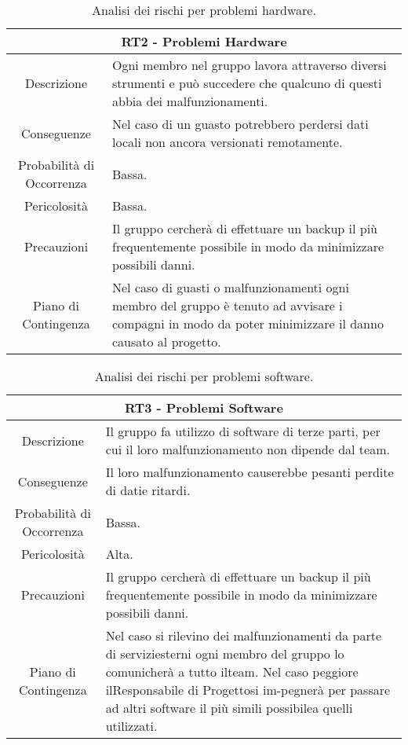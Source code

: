 \begin{table} [H]
    \begin{tabular}{|c | p{10cm}|}
    \hline
    \multicolumn{2}{|c|}{\textbf{RT2 - Problemi Hardware}} \\
    \hline
     Descrizione & Ogni membro nel gruppo lavora attraverso diversi strumenti e può succedere che qualcuno di questi abbia dei malfunzionamenti.\\ 
     \hline
     Conseguenze & Nel caso di un guasto potrebbero perdersi dati locali non ancora versionati remotamente.\\
     \hline
     Probabilità di Occorrenza & Bassa.\\
     \hline
     Pericolosità & Bassa.\\
     \hline
     Precauzioni & Il gruppo cercherà di effettuare un backup il più frequentemente possibile in modo da minimizzare possibili danni.\\  
     \hline
     Piano di Contingenza & Nel caso di guasti o malfunzionamenti ogni membro del gruppo è tenuto ad avvisare i compagni in modo da poter minimizzare il danno causato al progetto.\\ 
     \hline
    \end{tabular}
    \caption{\label{tab:RT2}Analisi dei rischi per problemi hardware.}
    \end{table}


\begin{table} [H]
    \begin{tabular}{|c | p{10cm}|}
    \hline
    \multicolumn{2}{|c|}{\textbf{RT3 - Problemi Software}} \\
    \hline
    Descrizione & Il gruppo fa utilizzo di software di terze parti, per cui il loro malfunzionamento non dipende dal team.\\ 
    \hline
    Conseguenze & Il loro malfunzionamento causerebbe pesanti perdite di datie ritardi.\\
    \hline
    Probabilità di Occorrenza & Bassa.\\
    \hline
    Pericolosità & Alta.\\
    \hline
    Precauzioni & Il gruppo cercherà di effettuare un backup il più frequentemente possibile in modo da minimizzare possibili danni.\\ 
    \hline
    Piano di Contingenza & Nel caso si rilevino dei malfunzionamenti da parte di serviziesterni ogni membro del gruppo lo comunicherà a tutto ilteam. Nel caso peggiore ilResponsabile di Progettosi im-pegnerà per passare ad altri software il più simili possibilea quelli utilizzati.\\ 
    \hline
    \end{tabular}
    \caption{\label{tab:RT3}Analisi dei rischi per problemi software.}
    
\end{table}



